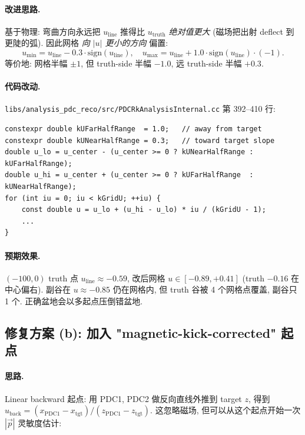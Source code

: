 \paragraph{改进思路.}
基于物理: 弯曲方向永远把 $u_{\mathrm{line}}$ 推得比 $u_{\mathrm{truth}}$ \emph{绝对值更大} (磁场把出射 deflect 到更陡的弧). 因此网格 \emph{向 $|u|$ 更小的方向} 偏置:
\[
  u_{\min} = u_{\mathrm{line}} - 0.3 \cdot \mathrm{sign}(u_{\mathrm{line}}), \quad u_{\max} = u_{\mathrm{line}} + 1.0 \cdot \mathrm{sign}(u_{\mathrm{line}}) \cdot (-1).
\]
等价地: 网格半幅 $\pm 1$, 但 truth-side 半幅 $-1.0$, 远 truth-side 半幅 $+0.3$.

\paragraph{代码改动.}
\texttt{libs/analysis\_pdc\_reco/src/PDCRkAnalysisInternal.cc} 第 392--410 行:
\begin{lstlisting}[caption={网格不对称延展 (建议改动)}]
constexpr double kUFarHalfRange  = 1.0;   // away from target
constexpr double kUNearHalfRange = 0.3;   // toward target slope
double u_lo = u_center - (u_center >= 0 ? kUNearHalfRange : kUFarHalfRange);
double u_hi = u_center + (u_center >= 0 ? kUFarHalfRange  : kUNearHalfRange);
for (int iu = 0; iu < kGridU; ++iu) {
    const double u = u_lo + (u_hi - u_lo) * iu / (kGridU - 1);
    ...
}
\end{lstlisting}

\paragraph{预期效果.}
$(-100, 0)$ truth 点 $u_{\mathrm{line}} \approx -0.59$, 改后网格 $u \in [-0.89, +0.41]$ (truth $-0.16$ 在中心偏右). 副谷在 $u \approx -0.85$ 仍在网格内, 但 truth 谷被 4 个网格点覆盖, 副谷只 1 个. 正确盆地会以多起点压倒错盆地.

\subsection{修复方案 (b): 加入 "magnetic-kick-corrected" 起点}
\label{sec:partIII:basin:fix_b}

\paragraph{思路.}
Linear backward 起点: 用 PDC1, PDC2 做反向直线外推到 target $z$, 得到 $u_{\mathrm{back}} = (x_{\mathrm{PDC1}} - x_{\mathrm{tgt}}) / (z_{\mathrm{PDC1}} - z_{\mathrm{tgt}})$. 这忽略磁场, 但可以从这个起点开始一次 $|\vec p|$ 灵敏度估计:

